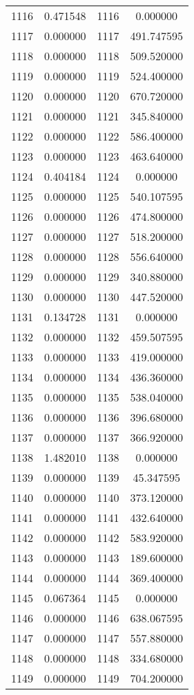 \documentclass[12pt]{article}
\begin{document}
\begin{longtable}{@{}cccc@{}}
1116 & 0.471548 & 1116 & 0.000000 \\
1117 & 0.000000 & 1117 & 491.747595 \\
1118 & 0.000000 & 1118 & 509.520000 \\
1119 & 0.000000 & 1119 & 524.400000 \\
1120 & 0.000000 & 1120 & 670.720000 \\
1121 & 0.000000 & 1121 & 345.840000 \\
1122 & 0.000000 & 1122 & 586.400000 \\
1123 & 0.000000 & 1123 & 463.640000 \\
1124 & 0.404184 & 1124 & 0.000000 \\
1125 & 0.000000 & 1125 & 540.107595 \\
1126 & 0.000000 & 1126 & 474.800000 \\
1127 & 0.000000 & 1127 & 518.200000 \\
1128 & 0.000000 & 1128 & 556.640000 \\
1129 & 0.000000 & 1129 & 340.880000 \\
1130 & 0.000000 & 1130 & 447.520000 \\
1131 & 0.134728 & 1131 & 0.000000 \\
1132 & 0.000000 & 1132 & 459.507595 \\
1133 & 0.000000 & 1133 & 419.000000 \\
1134 & 0.000000 & 1134 & 436.360000 \\
1135 & 0.000000 & 1135 & 538.040000 \\
1136 & 0.000000 & 1136 & 396.680000 \\
1137 & 0.000000 & 1137 & 366.920000 \\
1138 & 1.482010 & 1138 & 0.000000 \\
1139 & 0.000000 & 1139 & 45.347595 \\
1140 & 0.000000 & 1140 & 373.120000 \\
1141 & 0.000000 & 1141 & 432.640000 \\
1142 & 0.000000 & 1142 & 583.920000 \\
1143 & 0.000000 & 1143 & 189.600000 \\
1144 & 0.000000 & 1144 & 369.400000 \\
1145 & 0.067364 & 1145 & 0.000000 \\
1146 & 0.000000 & 1146 & 638.067595 \\
1147 & 0.000000 & 1147 & 557.880000 \\
1148 & 0.000000 & 1148 & 334.680000 \\
1149 & 0.000000 & 1149 & 704.200000 \\

\end{longtable}
\end{document}

